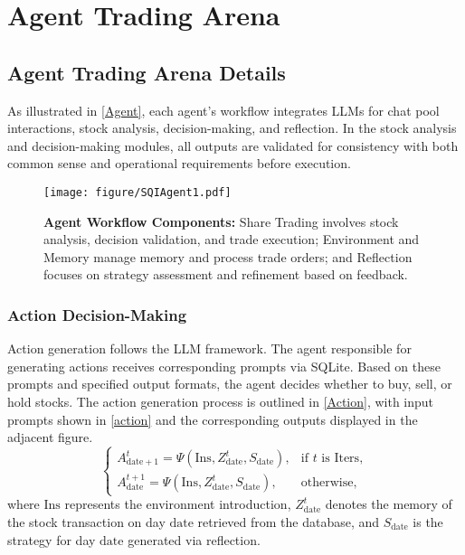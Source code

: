 \clearpage

\appendix

\section{Agent Trading Arena}
\label{appendix_arena}

\subsection{Agent Trading Arena Details}

As illustrated in \autoref{Agent}, each agent's workflow integrates LLMs for chat pool interactions, stock analysis, decision-making, and reflection. In the stock analysis and decision-making modules, all outputs are validated for consistency with both common sense and operational requirements before execution. 

\begin{figure*}[ht]
	\centering
	\texttt{[image: figure/SQIAgent1.pdf]}
	\caption{\textbf{Agent Workflow Components:} Share Trading involves stock analysis, decision validation, and trade execution; Environment and Memory manage memory and process trade orders; and Reflection focuses on strategy assessment and refinement based on feedback.}
	\label{Agent}
\end{figure*}

\subsubsection{Action Decision-Making}

Action generation follows the LLM framework. The agent responsible for generating actions receives corresponding prompts via SQLite. Based on these prompts and specified output formats, the agent decides whether to buy, sell, or hold stocks. The action generation process is outlined in \autoref{Action}, with input prompts shown in \autoref{action} and the corresponding outputs displayed in the adjacent figure.
\begin{equation}\label{Action}
	\begin{cases} 
	A_{\mathrm{date} + 1}^t = \Psi \left(\mathrm{Ins}, Z_{\mathrm{date}}^t, S_{\mathrm{date}} \right), & \text{if~} t \text{~is Iters}, \\
	A_{\mathrm{date}}^{t + 1} = \Psi \left(\mathrm{Ins}, Z_{\mathrm{date}}^t, S_{\mathrm{date}} \right), & \text{otherwise},
	\end{cases}
\end{equation}
where $\mathrm{Ins}$ represents the environment introduction, $Z_{\mathrm{date}}^t$ denotes the memory of the stock transaction on day $\mathrm{date}$ retrieved from the database, and $S_{\mathrm{date}}$ is the strategy for day $\mathrm{date}$ generated via reflection. 

